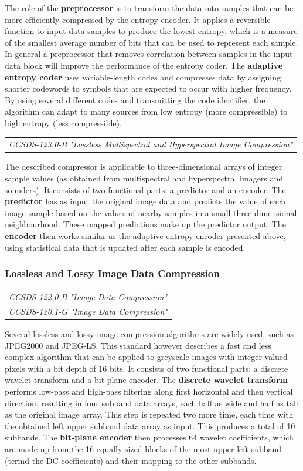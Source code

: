 The role of the \textbf{preprocessor} is to transform the data into samples that can be more efficiently compressed by the entropy encoder. It applies a reversible function to input data samples to produce the lowest entropy, which is a measure of the smallest average number of bits that can be used to represent each sample. In general a preprocessor that removes correlation between samples in the input data block will improve the performance of the entropy coder. The \textbf{adaptive entropy coder} uses variable-length codes and compresses data by assigning shorter codewords to symbols that are expected to occur with higher frequency. By using several different codes and transmitting the code identifier, the algorithm can adapt to many sources from low entropy (more compressible) to high entropy (less compressible).

\begin{tabular}{l}
\textit{CCSDS-123.0-B "Lossless Multispectral and Hyperspectral Image Compression" \cite{CCSDS-123.0-B}}
\end{tabular}

The described compressor is applicable to three-dimensional arrays of integer sample values (as obtained from multispectral and hyperspectral imagers and sounders). It consists of two functional parts: a predictor and an encoder. The \textbf{predictor} has as input the original image data and predicts the value of each image sample based on the values of nearby samples in a small three-dimensional neighbourhood. These mapped predictions make up the predictor output. The \textbf{encoder} then works similar as the adaptive entropy encoder presented above, using statistical data that is updated after each sample is encoded.

\subsubsection{Lossless and Lossy Image Data Compression}

\begin{tabular}{l}
\textit{CCSDS-122.0-B "Image Data Compression" \cite{CCSDS-122.0-B}} \\
\textit{CCSDS-120.1-G "Image Data Compression" \cite{CCSDS-120.1-G}}
\end{tabular}

Several lossless and lossy image compression algorithms are widely used, such as JPEG2000 and JPEG-LS. This standard however describes a fast and less complex algorithm that can be applied to greyscale images with integer-valued pixels with a bit depth of 16 bits. It consists of two functional parts: a discrete wavelet transform and a bit-plane encoder. The \textbf{discrete wavelet transform} performs low-pass and high-pass filtering along first horizontal and then vertical direction, resulting in four subband data arrays, each half as wide and half as tall as the original image array. This step is repeated two more time, each time with the obtained left upper subband data array as input. This produces a total of 10 subbands. The \textbf{bit-plane encoder} then processes 64 wavelet coefficients, which are made up from the 16 equally sized blocks of the most upper left subband (termd the DC coefficients) and their mapping to the other subbands.

